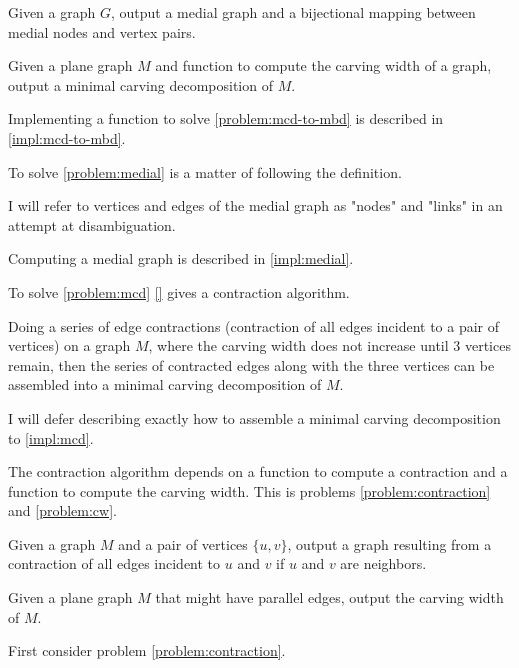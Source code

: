 \documentclass{article}
\begin{document}
	\begin{problem}\label{problem:medial}
		Given a graph $G$, output a medial graph and a bijectional mapping between medial nodes and vertex pairs.
	\end{problem}

	\begin{problem}\label{problem:mcd}
		Given a plane graph $M$ and function to compute the carving width of a graph, output a minimal carving decomposition of $M$.
	\end{problem}

	Implementing a function to solve \ref{problem:mcd-to-mbd} is described in \ref{impl:mcd-to-mbd}.

	To solve \ref{problem:medial} is a matter of following the definition.

	I will refer to vertices and edges of the medial graph as "nodes" and "links" in an attempt at disambiguation. 

	Computing a medial graph is described in \ref{impl:medial}.

	To solve \ref{problem:mcd} \ref{} gives a contraction algorithm.

	Doing a series of edge contractions (contraction of all edges incident to a pair of vertices) on a graph $M$, where the carving width does not increase until 3 vertices remain, then the series of contracted edges along with the three vertices can be assembled into a minimal carving decomposition of $M$.
	
	I will defer describing exactly how to assemble a minimal carving decomposition to \ref{impl:mcd}.

	The contraction algorithm depends on a function to compute a contraction and a function to compute the carving width. This is problems \ref{problem:contraction} and \ref{problem:cw}.

	\begin{problem}\label{problem:contraction}
		Given a graph $M$ and a pair of vertices $\{u, v\}$, output a graph resulting from a contraction of all edges incident to $u$ and $v$ if $u$ and $v$ are neighbors.
	\end{problem}

	\begin{problem}\label{problem:cw}
		Given a plane graph $M$ that might have parallel edges, output the carving width of $M$.
	\end{problem}

	First consider problem \ref{problem:contraction}.
\end{document}
